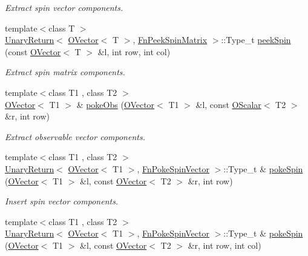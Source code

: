 \begin{DoxyCompactItemize}
\begin{DoxyCompactList}\small\item\em Extract spin vector components. \end{DoxyCompactList}\item 
{\footnotesize template$<$class T $>$ }\\\mbox{\hyperlink{structENSEM_1_1UnaryReturn}{Unary\+Return}}$<$ \mbox{\hyperlink{classENSEM_1_1OVector}{O\+Vector}}$<$ T $>$, \mbox{\hyperlink{structENSEM_1_1FnPeekSpinMatrix}{Fn\+Peek\+Spin\+Matrix}} $>$\+::Type\+\_\+t \mbox{\hyperlink{group__obsvector_gab454ed8a07dbd29bbb2851736c4635e6}{peek\+Spin}} (const \mbox{\hyperlink{classENSEM_1_1OVector}{O\+Vector}}$<$ T $>$ \&l, int row, int col)
\begin{DoxyCompactList}\small\item\em Extract spin matrix components. \end{DoxyCompactList}\item 
{\footnotesize template$<$class T1 , class T2 $>$ }\\\mbox{\hyperlink{classENSEM_1_1OVector}{O\+Vector}}$<$ T1 $>$ \& \mbox{\hyperlink{group__obsvector_gab682185c869b882a5be5eedf4fee8e74}{poke\+Obs}} (\mbox{\hyperlink{classENSEM_1_1OVector}{O\+Vector}}$<$ T1 $>$ \&l, const \mbox{\hyperlink{classENSEM_1_1OScalar}{O\+Scalar}}$<$ T2 $>$ \&r, int row)
\begin{DoxyCompactList}\small\item\em Extract observable vector components. \end{DoxyCompactList}\item 
{\footnotesize template$<$class T1 , class T2 $>$ }\\\mbox{\hyperlink{structENSEM_1_1UnaryReturn}{Unary\+Return}}$<$ \mbox{\hyperlink{classENSEM_1_1OVector}{O\+Vector}}$<$ T1 $>$, \mbox{\hyperlink{structENSEM_1_1FnPokeSpinVector}{Fn\+Poke\+Spin\+Vector}} $>$\+::Type\+\_\+t \& \mbox{\hyperlink{group__obsvector_gadea0fd5400f7060852f3cd990c3a8ab3}{poke\+Spin}} (\mbox{\hyperlink{classENSEM_1_1OVector}{O\+Vector}}$<$ T1 $>$ \&l, const \mbox{\hyperlink{classENSEM_1_1OVector}{O\+Vector}}$<$ T2 $>$ \&r, int row)
\begin{DoxyCompactList}\small\item\em Insert spin vector components. \end{DoxyCompactList}\item 
{\footnotesize template$<$class T1 , class T2 $>$ }\\\mbox{\hyperlink{structENSEM_1_1UnaryReturn}{Unary\+Return}}$<$ \mbox{\hyperlink{classENSEM_1_1OVector}{O\+Vector}}$<$ T1 $>$, \mbox{\hyperlink{structENSEM_1_1FnPokeSpinVector}{Fn\+Poke\+Spin\+Vector}} $>$\+::Type\+\_\+t \& \mbox{\hyperlink{group__obsvector_ga8b52874ec438b5bc2c6faef41097b352}{poke\+Spin}} (\mbox{\hyperlink{classENSEM_1_1OVector}{O\+Vector}}$<$ T1 $>$ \&l, const \mbox{\hyperlink{classENSEM_1_1OVector}{O\+Vector}}$<$ T2 $>$ \&r, int row, int col)

\end{DoxyCompactItemize}
